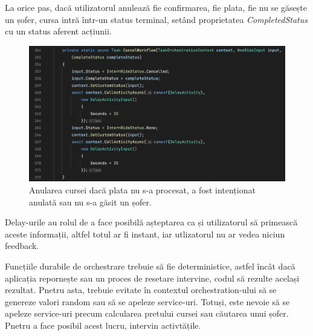 La orice pas, dacă utilizatorul anulează fie confirmarea, fie plata, fie nu se găsește un șofer, cursa intră într-un status
terminal, setând proprietatea \textit{CompletedStatus} cu un status aferent acțiunii.
\begin{figure}[H]
    \centering
    \includegraphics[width=14cm]{Assets/cancelFlow.png}
    \caption{Anularea cursei dacă plata nu s-a procesat, a fost intenționat anulată sau nu s-a găsit un șofer.}
    \label{fig:cancelFlow}
\end{figure}
Delay-urile au rolul de a face posibilă așteptarea ca și utilizatorul să primească aceste informații, altfel totul ar fi instant,
iar utlizatorul nu ar vedea niciun feedback.

Funcțiile durabile de orchestrare trebuie să fie deterministice, astfel încât dacă aplicația repornește
sau un proces de resetare intervine, codul să rezulte același rezultat. Pnetru asta, trebuie evitate în contextul
orchestration-ului să se genereze valori random sau să se apeleze service-uri. Totuși, este nevoie să se apeleze service-uri precum
calcularea pretului cursei sau căutarea unui șofer. Pnetru a face posibil acest lucru, intervin activtățile.

